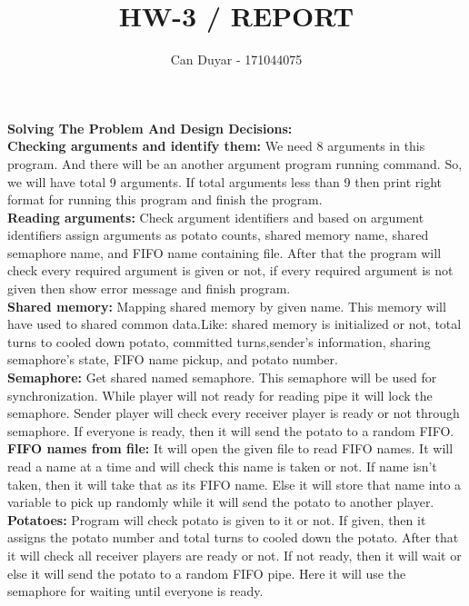 \documentclass[a4 paper]{article}
\title{HW-3 / REPORT}
\author{ Can Duyar - 171044075}
\begin{document}
\date{}
\maketitle

{\color{red}\large\textbf {Solving The Problem And Design Decisions:}}\newline\\
\textbf{Checking arguments and identify them:} We need 8 arguments in this program. And there will be an another argument program running
command. So, we will have total 9 arguments. If total arguments less than 9 then print right format for running this program and finish the program.\newline\\
\textbf{Reading arguments:} Check argument identifiers and based on argument identifiers assign arguments as potato
counts, shared memory name, shared semaphore name, and FIFO name containing file. After that the program will check every required argument is given or not, if every required argument is not given then show error message and finish program.\newline\\
\textbf{Shared memory:} Mapping shared memory by given name. This memory will have used to shared common data.Like: shared memory is initialized or not, total turns to cooled down potato, committed turns,sender’s information, sharing semaphore’s state, FIFO name pickup, and potato number.\newline\\
\textbf{Semaphore:} Get shared named semaphore. This semaphore will be used for synchronization. While player will not ready for reading pipe it will lock the semaphore. Sender player will check every receiver player is ready or not through semaphore. If everyone is ready, then it will send the potato to a random FIFO.\newline\\
\textbf{FIFO names from file:} It will open the given file to read FIFO names. It will read a name at a time and will check this name is taken or not. If name isn’t taken, then it will take that as its FIFO name. Else it will store that name into a variable to pick up randomly while it will send the potato to another player.\newline\\
\textbf{Potatoes:} Program will check potato is given to it or not. If given, then it assigns the potato number and total turns to cooled down the potato. After that it will check all receiver players are ready or not. If not ready, then it will wait or else it will send the potato to a random FIFO pipe. Here it will use the semaphore for waiting until everyone is ready.\newline\\
\end{document}
